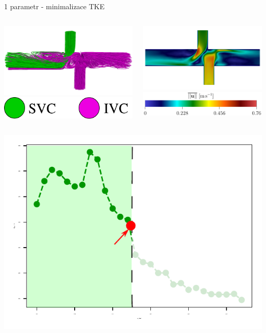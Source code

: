 \documentclass[aspectratio=169,xcolor=dvipsnames]{beamer}
\begin{document}
\begin{frame}{1 parametr - minimalizace TKE}
	\begin{columns}
		\begin{column}{.5\textwidth}
			\centering
			\includegraphics[width=1\linewidth, trim={0 -2mm 0 0}, clip]{Images/12IVCsplit.pdf}
			\includegraphics[width=0.33\linewidth, trim={0 0 0 0mm}, clip]{Images/split-leg.pdf}			
		\end{column}
		\begin{column}{.5\textwidth}
			\centering
			\includegraphics[width=1\linewidth, trim={0 0 0 0}, clip]{Images/08velocity-side.pdf}
			\includegraphics[width=0.65\linewidth, trim={0 0 0 0}, clip]{Images/mean_velocity_leg.pdf}
		\end{column}
	\end{columns}	
	\vspace{3mm}
	\begin{center}
		\includegraphics[width=.18\linewidth, trim={0 0 0 0}, clip]{Images/tke-mini.pdf}
	\end{center}	
\end{frame}
\end{document}
